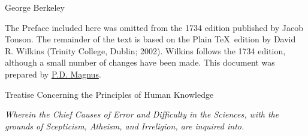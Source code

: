 \documentclass[]{article}
\newcommand*{\authortitle}[1]{\medskip\centerline{\Huge\sc #1}\bigskip}
\newcommand*{\itemtitle}[1]{\setstretch{1.8}\pagebreak[2]\begin{center}{\LARGE\sc #1}\end{center}\setstretch{1.2}}
\newcommand*{\itemsubtitle}[1]{\begin{center}\emph{#1}\end{center}}
\begin{document}

\authortitle{George Berkeley}



\noindent
The Preface included here was omitted from the 1734 edition published by Jacob Tonson. The remainder of the text is based on the Plain \TeX\ edition by David R. Wilkins (Trinity College, Dublin; 2002). Wilkins follows the 1734 edition, although a small number of changes have been made. This document was prepared by \href{https://www.fecundity.com}{P.D. Magnus}.


\itemtitle{Treatise Concerning the Principles of Human Knowledge}
\itemsubtitle{Wherein the Chief Causes of Error and Difficulty in the Sciences, with the grounds of Scepticism, Atheism, and Irreligion, are inquired into.}



\setcounter{tocdepth}{1}
\tableofcontents

\pagestyle{fancy}
\lfoot{\thepage}
\cfoot{}


\bigskip
\end{document}
